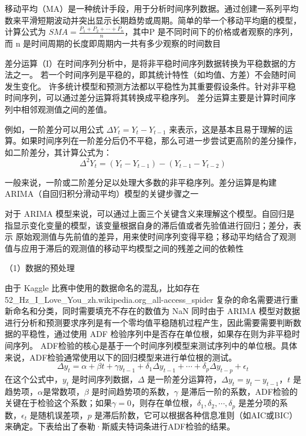 移动平均（MA）是一种统计手段，用于分析时间序列数据。通过创建一系列平均数来平滑短期波动并突出显示长期趋势或周期。简单的举一个移动平均磨的模型，计算公式为 $SMA = \frac{P_1 + P_2 + \cdots + P_n}{n}$，其中P 是不同时间下的价格或者观察的序列，
而 n 是时间周期的长度即周期内一共有多少观察的时间数目

差分运算（I）在时间序列分析中，是将非平稳时间序列数据转换为平稳数据的方法之一。
若一个时间序列是平稳的，即其统计特性（如均值、方差）不会随时间发生变化。
许多统计模型和预测方法都以平稳性为其重要假设条件。针对非平稳时间序列，可以通过差分运算将其转换成平稳序列。
差分运算主要是计算时间序列中相邻观测值之间的差值。

例如，一阶差分可以用公式 $\Delta Y_t = Y_t - Y_{t - 1}$ 来表示，这是基本且易于理解的运算。如果时间序列在一阶差分后仍不平稳，那么可进一步尝试更高阶的差分操作，如二阶差分，其计算公式为：
\begin{equation}
  \Delta^2 Y_t = (Y_t - Y_{t - 1}) - (Y_{t - 1} - Y_{t - 2})
\end{equation}

一般来说，一阶或二阶差分足以处理大多数的非平稳序列。差分运算是构建ARIMA（自回归积分滑动平均）模型的关键步骤之一

对于 ARIMA 模型来说，可以通过上面三个关键含义来理解这个模型。自回归是指显示变化变量的模型，该变量根据自身的滞后值或者先验值进行回归；差分，表示
原始观测值与先前值的差异，用来使时间序列变得平稳；移动平均结合了观测值与应用于滞后的观测值的移动平均模型之间的残差之间的依赖性

（1）数据的预处理

由于 Kaggle 比赛中使用的数据命名的混乱，比如存在 52\_Hz\_I\_Love\_You\_zh.wikipedia.org\_all-access\_spider 
复杂的命名需要进行重新命名和分类，同时需要填充不存在的数值为 NaN
同时由于 ARIMA 模型对数据进行分析和预测要求序列是有一个零均值平稳随机过程产生，因此需要需要判断数据的平稳性\cite{赵鹏2020基于}，通过使用 ADF 检验序列中是否存在单位根，如果存在则为非平稳时间序列。
ADF检验的核心是基于一个时间序列模型来测试序列中的单位根。具体来说，ADF检验通常使用以下的回归模型来进行单位根的测试。
\begin{equation}
    \Delta y_t = \alpha + \beta t + \gamma y_{t-1} + \delta_1 \Delta y_{t-1} + \cdots + \delta_p \Delta y_{t-p} + \epsilon_t
\end{equation}
在这个公式中，$y_t$ 是时间序列数据，$\Delta$ 是一阶差分运算符，$\Delta y_t = y_t - y_{t-1}$，$t$ 是趋势项，$\alpha$是常数项，$\beta$ 是时间趋势项的系数，$\gamma$ 是滞后一阶的系数，ADF检验的关键在于检验这个系数；如果$\gamma = 0$，则存在单位根，$\delta_1, \delta_2, \cdots, \delta_p$ 是差分项的系数，$\epsilon_t$ 是随机误差项，$p$ 是滞后阶数，它可以根据各种信息准则（如AIC或BIC）来确定。下表给出了泰勒·斯威夫特词条进行ADF检验的结果。

